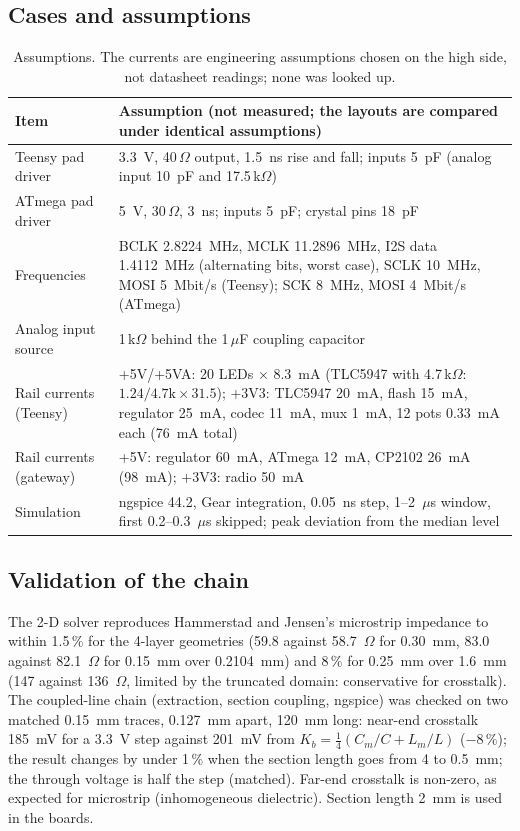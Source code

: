 \documentclass[10pt,a4paper]{article}
\begin{document}
\subsection{Cases and assumptions}

\begin{table}[H]\centering\small
\begin{tabular}{p{4.3cm}p{10.2cm}}
\toprule
Item & Assumption (not measured; the layouts are compared under identical assumptions)\\
\midrule
Teensy pad driver & 3.3~V, 40\,$\Omega$ output, 1.5~ns rise and fall; inputs 5~pF (analog input 10~pF and 17.5\,k$\Omega$)\\
ATmega pad driver & 5~V, 30\,$\Omega$, 3~ns; inputs 5~pF; crystal pins 18~pF\\
Frequencies & BCLK 2.8224~MHz, MCLK 11.2896~MHz, I2S data 1.4112~MHz (alternating bits, worst case), SCLK 10~MHz, MOSI 5~Mbit/s (Teensy); SCK 8~MHz, MOSI 4~Mbit/s (ATmega)\\
Analog input source & 1\,k$\Omega$ behind the 1\,$\mu$F coupling capacitor\\
Rail currents (Teensy) & +5V/+5VA: 20 LEDs $\times$ 8.3~mA (TLC5947 with 4.7\,k$\Omega$: $1.24/4.7\text{k}\times31.5$); +3V3: TLC5947 20~mA, flash 15~mA, regulator 25~mA, codec 11~mA, mux 1~mA, 12 pots 0.33~mA each (76~mA total)\\
Rail currents (gateway) & +5V: regulator 60~mA, ATmega 12~mA, CP2102 26~mA (98~mA); +3V3: radio 50~mA\\
Simulation & ngspice 44.2, Gear integration, 0.05~ns step, 1--2~$\mu$s window, first 0.2--0.3~$\mu$s skipped; peak deviation from the median level\\
\bottomrule
\end{tabular}
\caption{Assumptions. The currents are engineering assumptions chosen on the high side, not datasheet readings; none was looked up.}\label{tab:assume}
\end{table}

\subsection{Validation of the chain}\label{sec:valid}

The 2-D solver reproduces Hammerstad and Jensen's microstrip impedance to within 1.5\,\% for the 4-layer geometries (59.8 against 58.7~$\Omega$ for 0.30~mm, 83.0 against 82.1~$\Omega$ for 0.15~mm over 0.2104~mm) and 8\,\% for 0.25~mm over 1.6~mm (147 against 136~$\Omega$, limited by the truncated domain: conservative for crosstalk).
The coupled-line chain (extraction, section coupling, ngspice) was checked on two matched 0.15~mm traces, 0.127~mm apart, 120~mm long: near-end crosstalk 185~mV for a 3.3~V step against 201~mV from $K_b=\tfrac14(C_m/C+L_m/L)$ ($-8\,\%$);
the result changes by under 1\,\% when the section length goes from 4 to 0.5~mm; the through voltage is half the step (matched). Far-end crosstalk is non-zero, as expected for microstrip (inhomogeneous dielectric). Section length 2~mm is used in the boards.
\end{document}
